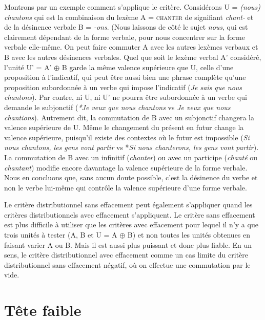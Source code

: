 Montrons par un exemple comment s’applique le critère. Considérons U = \textit{(nous) chantons} qui est la combinaison du lexème A = \textsc{chanter} de signifiant \textit{chant-} et de la désinence verbale B = \textit{{}-ons}. (Nous laissons de côté le sujet \textit{nous}, qui est clairement dépendant de la forme verbale, pour nous concentrer sur la forme verbale elle-même.
On peut faire commuter A avec les autres lexèmes verbaux et B avec les autres désinences verbales. Quel que soit le lexème verbal A’ considéré, l’unité U’ =  A’ ${\oplus}$ B garde la même valence supérieure que U, celle d’une proposition à l’indicatif, qui peut être aussi bien une phrase complète qu’une proposition subordonnée à un verbe qui impose l’indicatif (\textit{Je sais que nous chantons}). Par contre, ni U, ni U’ ne pourra être subordonnée à un verbe qui demande le subjonctif (\textit{*Je veux que nous chantons} vs \textit{Je veux que nous chantions}). Autrement dit, la commutation de B avec un subjonctif changera la valence supérieure de U. Même le changement du présent en futur change la valence supérieure, puisqu’il existe des contextes où le futur est impossible (\textit{Si nous chantons, les gens vont partir} vs *\textit{Si nous chanterons, les gens vont partir}). La commutation de B avec un infinitif (\textit{chanter}) ou avec un participe (\textit{chanté} ou \textit{chantant}) modifie encore davantage la valence supérieure de la forme verbale. Nous en concluons que, sans aucun doute possible, c’est la désinence du verbe et non le verbe lui-même qui contrôle la valence supérieure d’une forme verbale.

Le critère distributionnel sans effacement peut également s’appliquer quand les critères distributionnels avec effacement s’appliquent. Le critère sans effacement est plus difficile à utiliser que les critères avec effacement pour lequel il n'y a que trois unités à tester (A, B et U = A ${\oplus}$ B) et non toutes les unités obtenues en faisant varier A ou B. Mais il est aussi plus puissant et donc plus fiable. En un sens, le critère distributionnel avec effacement comme un cas limite du critère distributionnel sans effacement négatif, où on effectue une commutation par le vide. 

\section{ Tête faible}\label{sec:3.3.14}

